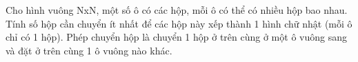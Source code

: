 Cho hình vuông NxN, một số ô có các hộp, mỗi ô có thể có nhiều hộp bao nhau. Tính số hộp cần chuyển ít nhất để các hộp này xếp thành 1 hình chữ nhật (mỗi ô chỉ có 1 hộp). Phép chuyển hộp là chuyển 1 hộp ở trên cùng ở một ô vuông sang và đặt ở trên cùng 1 ô vuông nào khác.